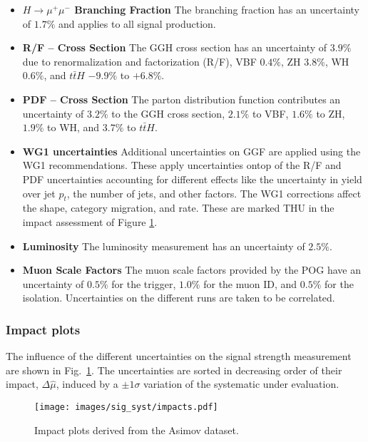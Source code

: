 \begin{itemize}
    \item {\bf $H\rightarrow\mu^+\mu^-$ Branching Fraction} The branching fraction has an uncertainty of $1.7\%$ and applies to all signal production.
    \item {\bf R/F -- Cross Section} The GGH cross section has an uncertainty of $3.9\%$ due to renormalization and factorization (R/F), 
    VBF $0.4\%$, ZH $3.8\%$, WH $0.6\%$, and $t\bar{t}H$ $-9.9\%$ to $+6.8\%$.
    \item {\bf PDF -- Cross Section} The parton distribution function contributes an uncertainty of $3.2\%$ to the GGH cross section, 
    $2.1\%$ to VBF, $1.6\%$ to ZH, $1.9\%$ to WH, and $3.7\%$ to $t\bar{t}H$.
    \item {\bf WG1 uncertainties} Additional uncertainties on GGF are applied using the WG1 recommendations.
    These apply uncertainties ontop of the R/F and PDF uncertainties accounting for different effects like the
    uncertainty in yield over jet $p_t$, the number of jets, and other factors.  
    The WG1 corrections affect the shape, category migration, and rate. 
    These are marked THU in the impact assessment of Figure \ref{fig:impacts}. 
    \item {\bf Luminosity} The luminosity measurement has an uncertainty of $2.5\%$.
    \item {\bf Muon Scale Factors} The muon scale factors provided by
      the POG have an uncertainty of $0.5\%$ for the trigger, $1.0\%$ for the muon ID, and $0.5\%$ for the isolation. 
      Uncertainties on the different runs are taken to be correlated.
\end{itemize}

\subsubsection{Impact plots}
The influence of the different uncertainties on the signal strength measurement are shown in Fig.~\ref{fig:impacts}. The uncertainties are sorted in decreasing order of their impact, $\Delta\hat{\mu}$, induced by a $\pm1\sigma$ variation of the systematic under evaluation.

\begin{figure}[h!]
    \centering
    \texttt{[image: images/sig\_syst/impacts.pdf]}
    \caption[Impact plots using the Asimov dataset.]
    {Impact plots derived from the Asimov dataset.}
    \label{fig:impacts}
\end{figure}

